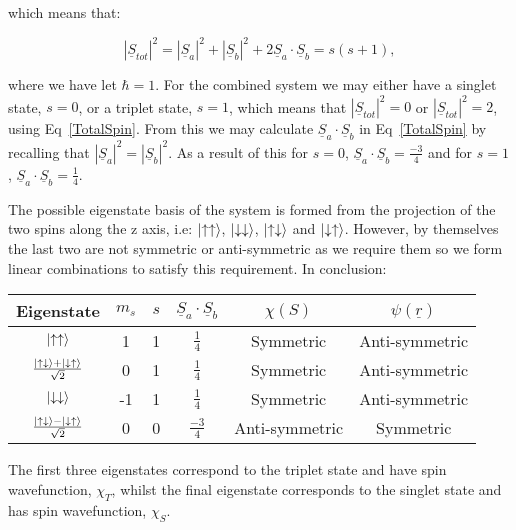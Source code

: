 \noindent which means that:

\begin{equation}
    |\underline{S}_{tot}|^2 = |\underline{S}_a|^2 + |\underline{S}_b|^2 + 2 \underline{S}_a \cdot \underline{S}_b = s(s + 1),
    \label{TotalSpin}
\end{equation}

\noindent where we have let $\hbar = 1$. For the combined system we may either have a singlet state, $s = 0$, or a triplet state, $s = 1$, which means that $|\underline{S}_{tot}|^2 = 0$ or $|\underline{S}_{tot}|^2 = 2$, using Eq~\ref{TotalSpin}. From this we may calculate $\underline{S}_a \cdot \underline{S}_b$ in Eq~\ref{TotalSpin} by recalling that $|\underline{S}_a|^2 = |\underline{S}_b|^2$. As a result of this for $s = 0$, $\underline{S}_a \cdot \underline{S}_b = \frac{-3}{4}$ and for $s = 1$, $\underline{S}_a \cdot \underline{S}_b = \frac{1}{4}$.

\noindent The possible eigenstate basis of the system is formed from the projection of the two spins along the z axis, i.e: $\ket{\uparrow \uparrow}$, $\ket{\downarrow \downarrow}$, $\ket{\uparrow \downarrow}$ and $\ket{\downarrow \uparrow}$. However, by themselves the last two are not symmetric or anti-symmetric as we require them so we form linear combinations to satisfy this requirement. In conclusion:

\begin{center}
\begin{tabular}{||c c c c c c||} 
 \hline
 Eigenstate & $m_s$ & $s$ & $\underline{S}_a \cdot \underline{S}_b$ & $\chi(S)$ & $\psi(\underline{r})$ \\ [0.5ex] 
 \hline\hline
 $\ket{\uparrow \uparrow}$ & 1 & 1 & $\frac{1}{4}$ & Symmetric & Anti-symmetric \\ 
 \hline
 $\frac{\ket{\uparrow \downarrow} + \ket{\downarrow \uparrow}}{\sqrt{2}}$ & 0 & 1 & $\frac{1}{4}$ & Symmetric & Anti-symmetric \\
 \hline
 $\ket{\downarrow \downarrow}$ & -1 & 1 & $\frac{1}{4}$ & Symmetric & Anti-symmetric \\
 \hline
 $\frac{\ket{\uparrow \downarrow} - \ket{\downarrow \uparrow}}{\sqrt{2}}$ & 0 & 0 & $\frac{-3}{4}$ & Anti-symmetric & Symmetric \\
 \hline
\end{tabular}
\end{center}

\noindent The first three eigenstates correspond to the triplet state and have spin wavefunction, $\chi_T$, whilst the final eigenstate corresponds to the singlet state and has spin wavefunction, $\chi_S$.

